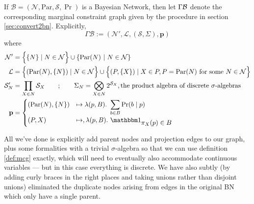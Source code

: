 \documentclass{article}
\begin{document}
	
	\begin{defn}
		If $\mathcal B = (\mathcal N, \mathrm{Par}, \mathcal S, \Pr)$ is a Bayesian Network, then let $\Gamma \cal B$ denote the corresponding marginal constraint graph given by the procedure in section \ref{sec:convert2bn}. Explicitly, 
		\[ \Gamma\mathcal B :=  (\mathcal N', \mathcal L, (\mathcal S, \Sigma), \mathbf p) \]
		where %
		\begin{align*}
			\mathcal N' &=  \left\{ \Big.\{N\} \mid N \in \mathcal N\right\} \cup \left\{ \mathrm{Par}(N) ~\middle|~ N \in \cal N \right\} \\%
			\mathcal L &= \left\{ \vphantom{\Big|}(\mathrm{Par}(N), \{N\}) \mid N \in \mathcal N \right\} \cup 
				\left\{\vphantom{\Big|} (P, \{X\}) \mid X \in P, P = \mathrm{Par}(N) \text{ for some }N \in \mathcal N \right\} \\
			\mathcal S'_N &= \prod_{X \in N} \mathcal S_X \qquad;\qquad
				\Sigma_N = \bigotimes_{X \in N} 2^{\mathcal S_X}, \text{the product algebra of discrete $\sigma$-algebras} \\
			\mathbf p &= \begin{cases}
				 	(\mathrm{Par}(N), \{N\}) &\mapsto \lambda(p, B).~ \displaystyle\sum_{b \in  B} \Pr(b \mid p) \\
				 	(P, X) &\mapsto, \lambda (p, B).~ \displaystyle \mathbbm 1_{\displaystyle\pi_X(p) \in B}
				\end{cases}
		\end{align*}
	\end{defn}
	All we've done is explicitly add parent nodes and projection edges to our graph, plus some formalities with a trivial $\sigma$-algebra so that we can use definition \ref{def:mcg} exactly, which will need to eventually also accommodate continuous variables --- but in this case everything is discrete. We have also subtly (by adding curly braces in the right places and taking unions rather than disjoint unions) eliminated the duplicate nodes arising from edges in the original BN which only have a single parent.

	
\end{document}
